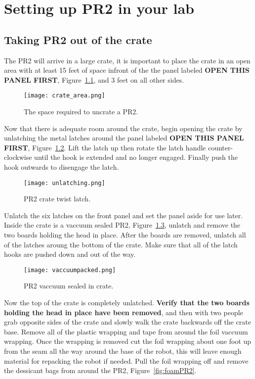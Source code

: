 \chapter{Setting up PR2 in your lab}
\section{Taking PR2 out of the crate}
The PR2 will arrive in a large crate, it is important to place the crate in an
open area with at least 15 feet of space infront of the the panel labeled {\bf
  OPEN THIS PANEL FIRST}, Figure~\ref{fig:crate_space}, and 3 feet on all other
sides.

\begin{figure}[h!]
\centering
\texttt{[image: crate\_area.png]}
\caption{The space required to uncrate a PR2.}
\label{fig:crate_space}
\end{figure}

Now that there is adequate room around the crate, begin opening the crate by
unlatching the metal latches around the panel labeled {\bf OPEN THIS PANEL
  FIRST}, Figure~\ref{fig:unlatch}. Lift the latch up then rotate the latch
handle counter-clockwise until the hook is extended and no longer
engaged. Finally push the hook outwards to disengage the latch.

\begin{figure}[h]
\centering
\texttt{[image: unlatching.png]}
\caption{PR2 crate twist latch.}
\label{fig:unlatch}
\end{figure}

Unlatch the six latches on the front panel and set the panel aside for use
later. Inside the crate is a vaccuum sealed PR2, Figure~\ref{fig:sealPR2},
unlatch and remove the two boards holding the head in place. After the boards
are removed, unlatch all of the latches aroung the bottom of the crate. Make
sure that all of the latch hooks are pushed down and out of the way.

\begin{figure}[h]
\centering
\texttt{[image: vaccuumpacked.png]}
\caption{PR2 vaccuum sealed in crate.}
\label{fig:sealPR2}
\end{figure}

Now the top of the crate is completely unlatched. {\bf Verify that the two boards holding the head in place have been removed}, and then with two people grab opposite
sides of the crate and slowly walk the crate backwards off the crate
base. Remove all of the plastic wrapping and tape from around the foil vaccuum
wrapping. Once the wrapping is removed cut the foil wrapping about one foot up
from the seam all the way around the base of the robot, this will leave enough
material for repacking the robot if needed. Pull the foil wrapping off and
remove the dessicant bags from around the PR2, Figure~\ref{fig:foamPR2}.

